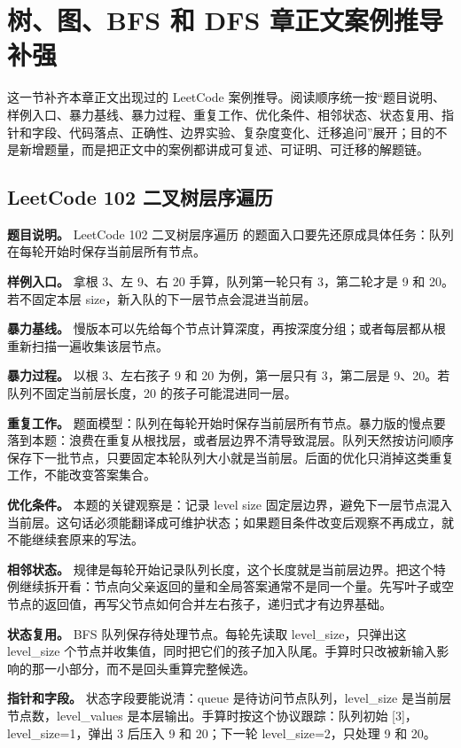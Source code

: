 \section{树、图、BFS 和 DFS 章正文案例推导补强}

这一节补齐本章正文出现过的 LeetCode 案例推导。阅读顺序统一按“题目说明、样例入口、暴力基线、暴力过程、重复工作、优化条件、相邻状态、状态复用、指针和字段、代码落点、正确性、边界实验、复杂度变化、迁移追问”展开；目的不是新增题量，而是把正文中的案例都讲成可复述、可证明、可迁移的解题链。

\subsection{LeetCode 102 二叉树层序遍历}

\textbf{题目说明。} LeetCode 102 二叉树层序遍历 的题面入口要先还原成具体任务：队列在每轮开始时保存当前层所有节点。

\textbf{样例入口。} 拿根 3、左 9、右 20 手算，队列第一轮只有 3，第二轮才是 9 和 20。若不固定本层 size，新入队的下一层节点会混进当前层。

\textbf{暴力基线。} 慢版本可以先给每个节点计算深度，再按深度分组；或者每层都从根重新扫描一遍收集该层节点。

\textbf{暴力过程。} 以根 3、左右孩子 9 和 20 为例，第一层只有 3，第二层是 9、20。若队列不固定当前层长度，20 的孩子可能混进同一层。

\textbf{重复工作。} 题面模型：队列在每轮开始时保存当前层所有节点。暴力版的慢点要落到本题：浪费在重复从根找层，或者层边界不清导致混层。队列天然按访问顺序保存下一批节点，只要固定本轮队列大小就是当前层。后面的优化只消掉这类重复工作，不能改变答案集合。

\textbf{优化条件。} 本题的关键观察是：记录 level size 固定层边界，避免下一层节点混入当前层。这句话必须能翻译成可维护状态；如果题目条件改变后观察不再成立，就不能继续套原来的写法。

\textbf{相邻状态。} 规律是每轮开始记录队列长度，这个长度就是当前层边界。把这个特例继续拆开看：节点向父亲返回的量和全局答案通常不是同一个量。先写叶子或空节点的返回值，再写父节点如何合并左右孩子，递归式才有边界基础。

\textbf{状态复用。} BFS 队列保存待处理节点。每轮先读取 level\_size，只弹出这 level\_size 个节点并收集值，同时把它们的孩子加入队尾。手算时只改被新输入影响的那一小部分，而不是回头重算完整候选。

\textbf{指针和字段。} 状态字段要能说清：queue 是待访问节点队列，level\_size 是当前层节点数，level\_values 是本层输出。手算时按这个协议跟踪：队列初始 [3]，level\_size=1，弹出 3 后压入 9 和 20；下一轮 level\_size=2，只处理 9 和 20。

